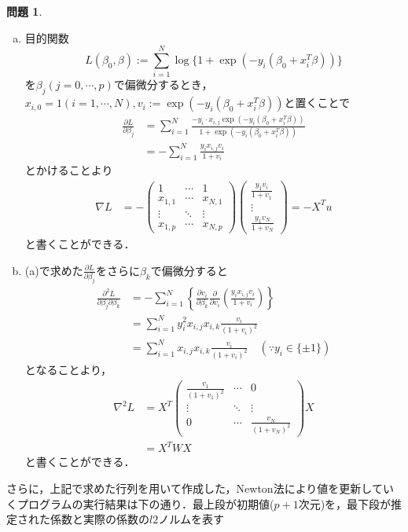 \documentclass{jsarticle}
\theoremstyle{definition}
\newtheorem{Ex}{問題}
\theoremstyle{mystyle} %
\begin{document}
\large
\begin{Ex}
\begin{enumerate}[(a)]
\item 目的関数
$$L(\beta_0,\beta):=\sum_{i=1}^N \log\{1+\exp(-y_i(\beta_0+x_i^T \beta))\}$$
を$\beta_j(j=0,\cdots,p)$で偏微分するとき，$x_{i,0}=1(i=1,\cdots ,N),v_i :=\exp(-y_i(\beta_0+x_i^T \beta)) $と置くことで
\begin{align*}
\frac{\partial L}{\partial \beta_j}&=\sum_{i=1}^N\frac{-y_i\cdot x_{i,j}\exp(-y_i(\beta_0+x_i^T \beta))}{1+\exp(-y_i(\beta_0+x_i^T \beta))}\\
&=-\sum_{i=1}^N\frac{y_ix_{i,j} v_i}{1+v_i}
\end{align*}
とかけることより
\begin{align*}
\nabla L&=-\begin{pmatrix}
1 & \cdots & 1\\
x_{1,1} & \cdots & x_{N,1}\\
\vdots & \ddots & \vdots \\
x_{1,p} & \cdots & x_{N,p}
\end{pmatrix}\left(\begin{array}{c}
\frac{y_1 v_i}{1+v_1}\\
\vdots \\
\frac{y_1 v_N}{1+v_N}
\end{array}\right)=-X^T u
\end{align*}
と書くことができる．\\

\item (a)で求めた$\frac{\partial L}{\partial \beta_j}$をさらに$\beta_k$で偏微分すると
\begin{align*}
\frac{\partial^2 L}{\partial \beta_j \partial \beta_k}&=-\sum_{i=1}^N \left\{\frac{\partial v_i}{\partial \beta_k}\frac{\partial }{\partial v_i}\left(\frac{y_ix_{i,j}v_i}{1+v_i}\right)\right\}\\
&=\sum_{i=1}^Ny_i^2x_{i,j}x_{i,k}\frac{v_i}{(1+v_i)^2}\\
&=\sum_{i=1}^Nx_{i,j}x_{i,k}\frac{v_i}{(1+v_i)^2}\quad(\because y_i\in \{\pm 1\})
\end{align*}
となることより，
\begin{align*}
\nabla^2 L &=X^T\begin{pmatrix}
\frac{v_1}{(1+v_1)^2} & \cdots & 0\\
\vdots & \ddots & \vdots \\
0 & \cdots & \frac{v_N}{(1+v_N)^2}
\end{pmatrix}X\\
&=X^TWX
\end{align*}
と書くことができる．\\
\end{enumerate}
さらに，上記で求めた行列を用いて作成した，Newton法により値を更新していくプログラムの実行結果は下の通り．最上段が初期値($p+1$次元)を，最下段が推定された係数と実際の係数の$l2$ノルムを表す


\end{Ex}
\end{document}
